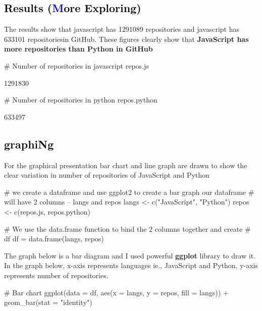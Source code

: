 \documentclass{article}\usepackage[]{graphicx}\usepackage[]{color}
\begin{document}
{\subsection*{\Large\textcolor{black}{Results (\textcolor{blue}{M}\textcolor{black}{ore Exploring)}}}
The results show that javascript has 1291089 repositories and javascript has 633101 repositoriesin GitHub. These figures clearly show that \textbf{JavaScript has more repositories than Python in GitHub}

\begin{Schunk}
\begin{Sinput}
# Number of repositories in javascript
repos.js
\end{Sinput}
\begin{Soutput}
[1] 1291830
\end{Soutput}
\begin{Sinput}
# Number of repositories in python
repos.python
\end{Sinput}
\begin{Soutput}
[1] 633497
\end{Soutput}
\end{Schunk}

\subsection*{\Large\textcolor{black}{graphiNg}}
For the graphical presentation bar chart and line graph are drawn to show the clear variation in number of repositories of JavaScript and Python

\begin{Schunk}
\begin{Sinput}
# we create a dataframe and use ggplot2 to create a bar graph our dataframe
# will have 2 columns -- langs and repos
langs <- c("JavaScript", "Python")
repos <- c(repos.js, repos.python)

# We use the data.frame function to bind the 2 columns together and create
# df
df = data.frame(langs, repos)
\end{Sinput}
\end{Schunk}

The graph below is a bar diagram and I used powerful \textbf{ggplot} library to draw it. In the graph below, x-axis represents languages ie., JavaScript and Python, y-axis represents number of repositories.  

\begin{Schunk}
\begin{Sinput}
# Bar chart
ggplot(data = df, aes(x = langs, y = repos, fill = langs)) + geom_bar(stat = "identity")
\end{Sinput}


\end{Schunk}}
\end{document}
